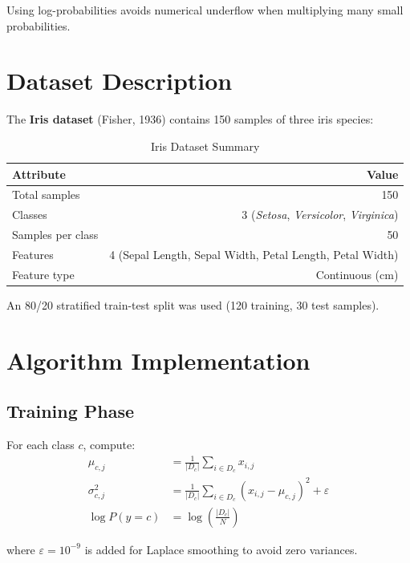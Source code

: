 \documentclass[12pt,a4paper]{article}
\begin{document}
Using log-probabilities avoids numerical underflow when multiplying many small probabilities.

\section{Dataset Description}

The \textbf{Iris dataset} (Fisher, 1936) contains 150 samples of three iris species:

\begin{table}[H]
\centering
\caption{Iris Dataset Summary}
\begin{tabular}{l r}
\toprule
\textbf{Attribute} & \textbf{Value} \\
\midrule
Total samples     & 150 \\
Classes           & 3 (\textit{Setosa}, \textit{Versicolor}, \textit{Virginica}) \\
Samples per class & 50 \\
Features          & 4 (Sepal Length, Sepal Width, Petal Length, Petal Width) \\
Feature type      & Continuous (cm) \\
\bottomrule
\end{tabular}
\end{table}

An 80/20 stratified train-test split was used (120 training, 30 test samples).

\section{Algorithm Implementation}

\subsection{Training Phase}

For each class $c$, compute:
\begin{align}
  \mu_{c,j}       &= \frac{1}{|D_c|} \sum_{i \in D_c} x_{i,j} \\
  \sigma_{c,j}^2  &= \frac{1}{|D_c|} \sum_{i \in D_c} (x_{i,j} - \mu_{c,j})^2 + \varepsilon \\
  \log P(y=c)     &= \log\!\left(\frac{|D_c|}{N}\right)
\end{align}

where $\varepsilon = 10^{-9}$ is added for Laplace smoothing to avoid zero variances.
\end{document}
